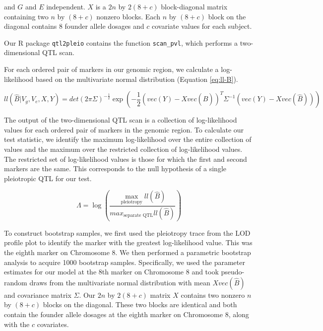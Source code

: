 \documentclass[oneside]{book}
\begin{document}
and $G$ and $E$ independent. $X$ is a $2n$ by $2(8 + c)$ block-diagonal matrix containing two $n$ by $(8 + c)$ nonzero blocks. Each $n$ by $(8 + c)$ block on the diagonal contains $8$ founder allele dosages and $c$ covariate values for each subject.  

Our R package \texttt{qtl2pleio} contains the function \texttt{scan\_pvl}, which performs a two-dimensional QTL scan. 

For each ordered pair of markers in our genomic region, we calculate a log-likelihood based on the multivariate normal distribution (Equation \ref{eq:ll-B}).

\begin{equation}
ll(\hat B | V_g, V_e, X, Y) = det\left(2\pi\Sigma\right)^{-\frac{1}{2}}\exp{\left(- \frac{1}{2}(vec(Y) - Xvec(\hat B))^T\Sigma^{-1}(vec(Y) - Xvec(\hat B))\right)}
\label{eq:ll-B}
\end{equation}




The output of the two-dimensional QTL scan is a collection of log-likelihood values for each ordered pair of markers in the genomic region. To calculate our test statistic, we identify the maximum log-likelihood over the entire collection of values and the maximum over the restricted collection of log-likelihood values. The restricted set of log-likelihood values is those for which the first and second markers are the same. This corresponds to the null hypothesis of a single pleiotropic QTL for our test.

\begin{equation}
\Lambda = \log\left(\frac{\max_{\text{pleiotropy}}ll(\hat B)}{max_{\text{separate QTL}}ll(\hat B)}\right)
\end{equation}



To construct bootstrap samples, we first used the pleiotropy trace from the LOD profile plot to identify the marker with the greatest log-likelihood value. This was the eighth marker on Chromosome 8. We then performed a parametric bootstrap analysis to acquire 1000 bootstrap samples. Specifically, we used the parameter estimates for our model at the 8th marker on Chromosome 8 and took pseudo-random draws from the multivariate normal distribution with mean $Xvec(\hat B)$ and covariance matrix $\Sigma$. Our $2n$ by $2(8 + c)$ matrix $X$ contains two nonzero $n$ by $(8 + c)$ blocks on the diagonal. These two blocks are identical and both contain the founder allele dosages at the eighth marker on Chromosome 8, along with the $c$ covariates. 
\end{document}
